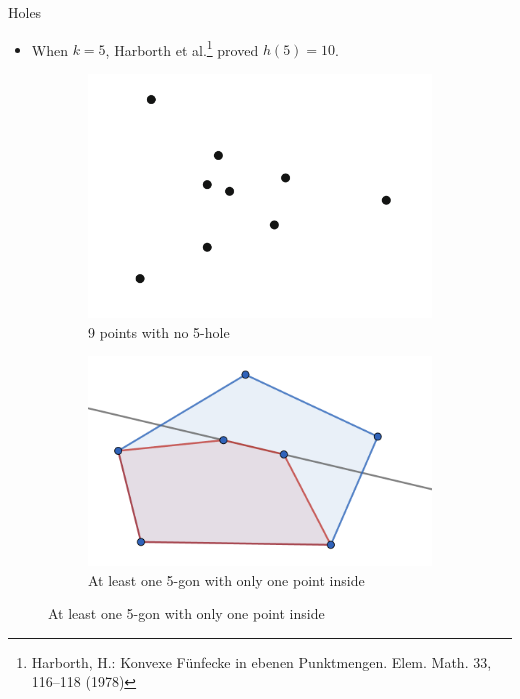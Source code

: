 \documentclass{beamer}
\begin{document}
\begin{frame}{Holes}

	\begin{itemize}
		\item
		      When $k=5$, Harborth et al.\footnote{Harborth, H.: Konvexe Fünfecke in ebenen Punktmengen. Elem. Math. 33, 116–118 (1978)} proved $h(5)=10$.

	\end{itemize}

	\begin{figure}
		\centering

	\end{figure}

	\begin{figure}
		\centering
		\begin{subfigure}[t]{0.45\textwidth}
			\includegraphics[width=\linewidth]{h5.png}
			\caption{9 points with no 5-hole}
			\label{fig5h}
		\end{subfigure}
		\begin{subfigure}[t]{0.5\textwidth}
			\includegraphics[width=\textwidth]{5gon-1.png}
			\caption{At least one 5-gon with only one point inside}
			\label{fig5gon1}
		\end{subfigure}
		\label{figk5}
	\end{figure}

\end{frame}
\end{document}
